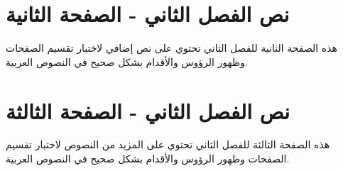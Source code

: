 \section{نص الفصل الثاني - الصفحة الثانية}

هذه الصفحة الثانية للفصل الثاني تحتوي على نص إضافي لاختبار تقسيم الصفحات وظهور الرؤوس والأقدام بشكل صحيح في النصوص العربية.

\newpage

\section{نص الفصل الثاني - الصفحة الثالثة}

هذه الصفحة الثالثة للفصل الثاني تحتوي على المزيد من النصوص لاختبار تقسيم الصفحات وظهور الرؤوس والأقدام بشكل صحيح في النصوص العربية.
